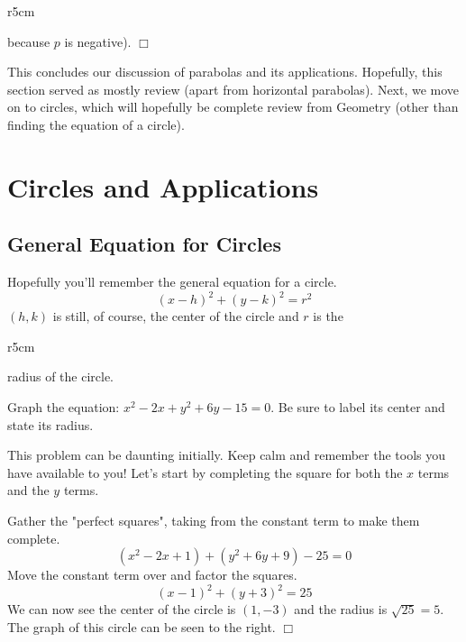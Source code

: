 \documentclass[lang=en,11pt]{elegantbook}
\begin{document}
\begin{wrapfigure}{r}{5cm}
\end{wrapfigure}

\noindent because $p$ is negative). $\Box$

This concludes our discussion of parabolas and its applications.  Hopefully, this section served as mostly review (apart from horizontal parabolas).  Next, we move on to circles, which will hopefully be complete review from Geometry (other than finding the equation of a circle).
\section{Circles and Applications}
\subsection{General Equation for Circles}
\noindent Hopefully you'll remember the general equation for a circle.
$$ (x-h)^2 + (y-k)^2 = r^2 $$
$(h,k)$ is still, of course, the center of the circle and $r$ is the

\begin{wrapfigure}{r}{5cm}
\end{wrapfigure}

\noindent radius of the circle.

\begin{example}
Graph the equation: $x^2-2x+y^2+6y-15=0$.  Be sure to label its center and state its radius.
\end{example}
\begin{solution}
This problem can be daunting initially.  Keep calm and remember the tools you have available to you!  Let's start by completing the square for both the $x$ terms and the $y$ terms.

Gather the "perfect squares", taking from the constant term to make them complete.
$$ (x^2-2x+1)+(y^2+6y+9)-25=0 $$
Move the constant term over and factor the squares.
$$ (x-1)^2+(y+3)^2=25 $$
We can now see the center of the circle is $(1,-3)$ and the radius is $\sqrt{25}=5$.  The graph of this circle can be seen to the right. $\Box$
\end{solution}
\end{document}
